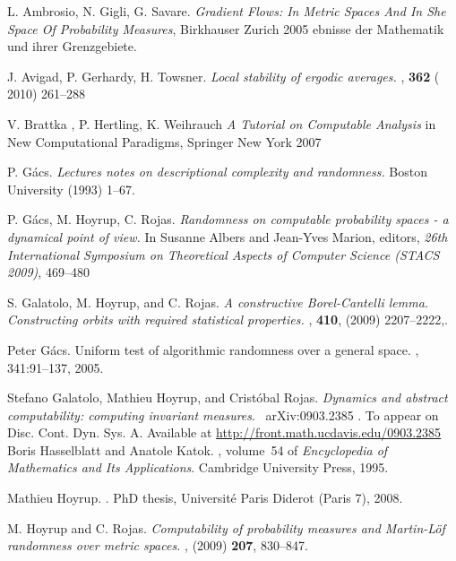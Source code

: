 \documentclass[copyright,creativecommons]{eptcs}
\numberwithin{equation}{section}
\begin{document}
\begin{thebibliography}{99}
 L. Ambrosio, N. Gigli, G. Savare. \emph{Gradient Flows: In
Metric Spaces And In She Space Of Probability Measures}, Birkhauser Zurich
2005 ebnisse der Mathematik und ihrer Grenzgebiete.

 J. Avigad, P. Gerhardy, H. Towsner. \newblock\emph{Local stability of ergodic averages.}
, \textbf{362} ( 2010) 261--288

 V. Brattka , P. Hertling, K. Weihrauch \emph{A Tutorial on
Computable Analysis }in New Computational Paradigms, Springer New York 2007

 P. G\'{a}cs. \emph{Lectures notes on descriptional complexity
and randomness.} Boston University (1993) 1--67.

 P. G{\'{a}}cs, M. Hoyrup, C. Rojas. \newblock\emph{Randomness on computable probability spaces - a dynamical point of view.} \newblock In Susanne Albers and Jean-Yves Marion, editors, \emph{26th
International Symposium on Theoretical Aspects of Computer Science (STACS
2009)}, 469--480

 S. Galatolo, M. Hoyrup, and C. Rojas. \newblock\emph{A
constructive {B}orel-{C}antelli lemma. {C}onstructing orbits with required
statistical properties.} , \textbf{410},
(2009) 2207--2222,.

 Peter G{\'{a}}cs. \newblock Uniform test of algorithmic
randomness over a general space.
, 341:91--137, 2005.

 Stefano Galatolo, Mathieu Hoyrup, and Crist\'{o}bal
Rojas. \newblock\emph{Dynamics and abstract computability: computing
invariant measures}. \ arXiv:0903.2385 . To appear on Disc. Cont. Dyn. Sys.
A.  Available at \url{http://front.math.ucdavis.edu/0903.2385}
 Boris Hasselblatt and Anatole Katok.
, volume~54 of \emph{Encyclopedia of Mathematics and Its Applications}. \newblock Cambridge
University Press, 1995.

 Mathieu Hoyrup.
. \newblock PhD thesis,
Universit\'{e} Paris Diderot (Paris 7), 2008.

 M. Hoyrup and C. Rojas. \newblock\emph{Computability of
probability measures and {M}artin-{L}{\"{o}}f randomness over metric spaces.}
, (2009) \textbf{207}, 830--847.


\end{thebibliography}
\end{document}

